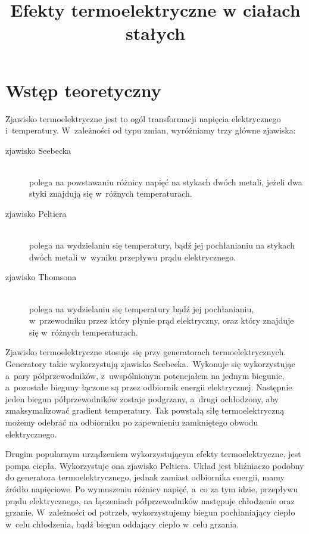 \documentclass[a4paper,12pt]{article}
\author{}
\title{Efekty termoelektryczne w ciałach stałych}
\begin{document}
\maketitle
\newpage
\section{Wstęp teoretyczny}
Zjawisko termoelektryczne jest to ogól transformacji napięcia elektrycznego i~temperatury. W~zależności od typu zmian, wyróżniamy trzy główne zjawiska:
\begin{description}
\item[zjawisko Seebecka]\hfill \\
	polega na powstawaniu różnicy napięć na stykach dwóch metali, jeżeli dwa styki znajdują się w~różnych temperaturach.
\item[zjawisko Peltiera] \hfill \\
	polega na wydzielaniu się temperatury, bądź jej pochłanianiu na stykach dwóch metali w~wyniku przepływu prądu elektrycznego.
\item[zjawisko Thomsona] \hfill \\
	polega na wydzielaniu się temperatury bądź jej pochłanianiu, w~przewodniku przez który płynie prąd elektryczny, oraz który znajduje się w~różnych temperaturach.
\end{description}

Zjawisko termoelektryczne stosuje się przy generatorach termoelektrycznych.
Generatory takie wykorzystują zjawisko Seebecka.\
Wykonuje się wykorzystując a~pary półprzewodników, z~uwspólnionym potencjałem na jednym biegunie, a~pozostałe bieguny łączone są przez odbiornik energii elektrycznej.
Następnie jeden biegun półprzewodników zostaje podgrzany, a~drugi ochłodzony, aby zmaksymalizować gradient temperatury.
Tak powstałą siłę termoelektryczną możemy odebrać na odbiorniku po zapewnieniu zamkniętego obwodu elektrycznego.

Drugim popularnym urządzeniem wykorzystującym efekty termoelektryczne, jest pompa ciepła.
Wykorzystuje ona zjawisko Peltiera. Układ jest bliźniaczo podobny do generatora termoelektrycznego, jednak zamiast odbiornika energii, mamy źródło napięciowe.
Po wymuszeniu różnicy napięć, a~co za tym idzie, przepływu prądu elektrycznego, na łączeniach półprzewodników następuje chłodzenie oraz grzanie.
W~zależności od potrzeb, wykorzystujemy biegun pochłaniający ciepło w~celu chłodzenia, bądź biegun oddający ciepło w~celu grzania.
\end{document}
